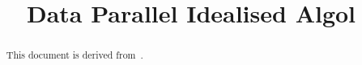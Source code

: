 \documentclass[
  nonacm,
  format=acmsmall,
  screen=true,
  timestamp=true
]{acmart}
\newcommand{\papertitle}{Data Parallel Idealised Algol}
\begin{document}
\title{\papertitle}





\authorsaddresses{}

\begin{abstract}
    This document is derived from~\cite{DBLP:journals/corr/abs-1710-08332}.
\end{abstract}
\end{document}
